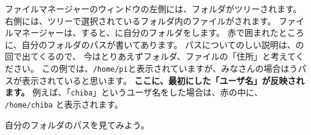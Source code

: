 \documentclass[text01.tex]{subfiles}
\begin{document}


ファイルマネージャーのウィンドウの左側には、フォルダがツリーされます。
右側には、ツリーで選択されているフォルダ内のファイルがされます。
ファイルマネージャーは、すると、に自分のフォルダをします。
赤で囲まれたところに、自分のフォルダのパスが書いてあります。
パスについてのしい説明は、の回で出てくるので、
今はとりあえずフォルダ、ファイルの「住所」と考えてください。
この例では、\verb|/home/pi|と表示されていますが、みなさんの場合はうパスが表示されていると思います。
\textbf{\color{red}ここに、最初にした「ユーザ名」が反映されます。}
例えば、「\verb|chiba|」というユーザ名をした場合は、赤の中に、
\verb|/home/chiba| と表示されます。
\vspace{20pt}

\begin{tcolorbox}[title=\useOmetoi,breakable]
  自分のフォルダのパスを見てみよう。
  \begin{enumerate}
  \end{enumerate}
\end{tcolorbox}
\clearpage
\end{document}
